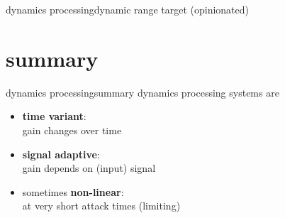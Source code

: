 \begin{frame}{dynamics processing}{dynamic range target (opinionated)}
    \begin{figure}
    \end{figure}
\end{frame}

\section{summary}
\begin{frame}{dynamics processing}{summary}
	dynamics processing systems are
    \smallskip
	\begin{itemize}
		\item	\textbf{time variant}:\\ gain changes over time
		\bigskip
		\item	\textbf{signal adaptive}:\\ gain depends on (input) signal
		\bigskip
		\item	sometimes \textbf{non-linear}:\\ at very short attack times (limiting)
	\end{itemize}
\end{frame}



